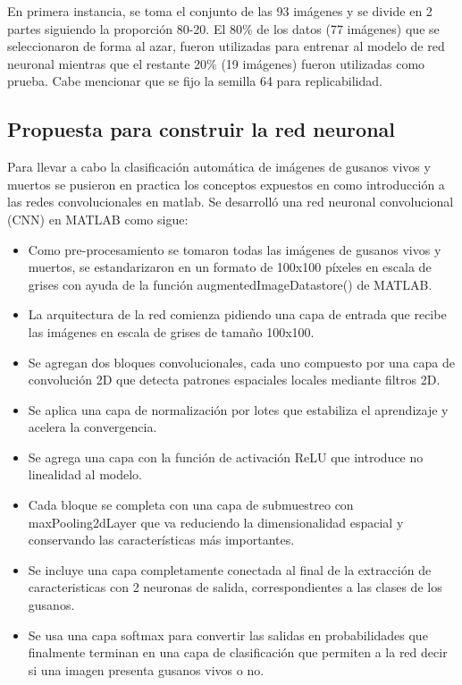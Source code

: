 \documentclass[11pt, letterpaper]{article}
\begin{document}
En primera instancia, se toma el conjunto de las 93 imágenes y se divide en 2 partes siguiendo la proporción 80-20. El 80\% de los datos (77 imágenes) que se seleccionaron de forma al azar, fueron utilizadas para entrenar al modelo de red neuronal mientras que el restante 20\% (19 imágenes) fueron utilizadas como prueba. Cabe mencionar que se fijo la semilla 64 para replicabilidad.

\subsection{Propuesta para construir la red neuronal}

Para llevar a cabo la clasificación automática de imágenes de gusanos vivos y muertos se pusieron en practica los conceptos expuestos en \cite{wu2017introduction} como introducción a las redes convolucionales en matlab. Se desarrolló una red neuronal convolucional (CNN) en MATLAB como sigue:

\begin{itemize}
	\item Como pre-procesamiento se tomaron todas las imágenes de gusanos vivos y muertos, se estandarizaron en un formato de 100x100 píxeles en escala de grises con ayuda de la función augmentedImageDatastore() de MATLAB.

	\item La arquitectura de la red comienza pidiendo una capa de entrada que recibe las imágenes en escala de grises de tamaño 100x100.
	
	\item Se agregan dos bloques convolucionales, cada uno compuesto por una capa de convolución 2D que detecta patrones espaciales locales mediante filtros 2D.
	
	\item Se aplica una capa de normalización por lotes que estabiliza el aprendizaje y acelera la convergencia.
	
	\item Se agrega una capa con la función de activación ReLU que introduce no linealidad al modelo.
	
	\item Cada bloque se completa con una capa de submuestreo con maxPooling2dLayer que va reduciendo la dimensionalidad espacial y conservando las características más importantes.
	
	\item Se incluye una capa completamente conectada al final de la extracción de caracteristicas con 2 neuronas de salida, correspondientes a las clases de los gusanos.
	
	\item Se usa una capa softmax para convertir las salidas en probabilidades que finalmente terminan en una capa de clasificación que permiten a la red decir si una imagen presenta gusanos vivos o no.
	
	
\end{itemize}
\end{document}
